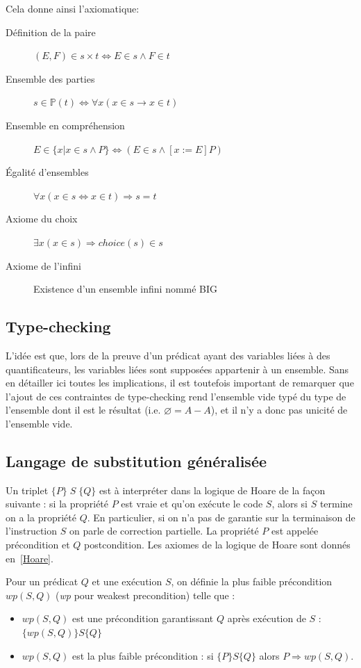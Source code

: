 \documentclass[10pt,a4paper]{article}
\begin{document}
Cela donne ainsi l'axiomatique:
\begin{description}
\item[Définition de la paire] $(E, F) \in s \times t \Leftrightarrow E \in s \wedge F \in t$
\item[Ensemble des parties] $s \in \mathbb{P}(t) \Leftrightarrow \forall x (x \in s \rightarrow x \in t)$
\item[Ensemble en compréhension] $E \in \{ x | x \in s \wedge P \} \Leftrightarrow (E \in s \wedge [x:= E] P)$
\item[Égalité d'ensembles] $\forall x (x \in s \Leftrightarrow x \in t) \Rightarrow s = t$
\item[Axiome du choix] $\exists x  (x \in s) \Rightarrow choice(s) \in s$
\item[Axiome de l'infini] Existence d'un ensemble infini nommé BIG
\end{description}

\subsection{Type-checking}

L'idée est que, lors de la preuve d'un prédicat ayant des variables liées à des quantificateurs, les variables liées sont supposées appartenir à un ensemble.
Sans en détailler ici toutes les implications, il est toutefois important de remarquer que l'ajout de ces contraintes de type-checking rend l'ensemble vide typé du type de l'ensemble dont il est le résultat (i.e. $\varnothing = A - A$), et il n'y a donc pas unicité de l'ensemble vide. 

\subsection{Langage de substitution généralisée}

Un triplet $ \{P\}\;S\;\{Q\} $ est à interpréter dans la logique de Hoare de la façon suivante : si la propriété $P$ est vraie et qu'on exécute le code $S$, alors si $S$ termine on a la propriété $Q$. En particulier, si on n'a pas de garantie sur la terminaison de l'instruction $S$ on parle de correction partielle. La propriété $P$ est appelée précondition et $Q$ postcondition. Les axiomes de la logique de Hoare sont donnés en~\cref{Hoare}.

Pour un prédicat $Q$ et une exécution $S$, on définie la plus faible précondition $wp(S, Q)$ (\emph{wp} pour weakest precondition) telle que :
\begin{itemize}
\item $wp(S, Q)$ est une précondition garantissant $Q$  après exécution de $S$ : $ \{ wp(S, Q) \} S \{ Q\}$
\item $wp(S, Q)$  est la plus faible précondition : si $\{ P \} S \{ Q \}$ alors $P \Rightarrow wp(S, Q)$.
\end{itemize}~
\end{document}
